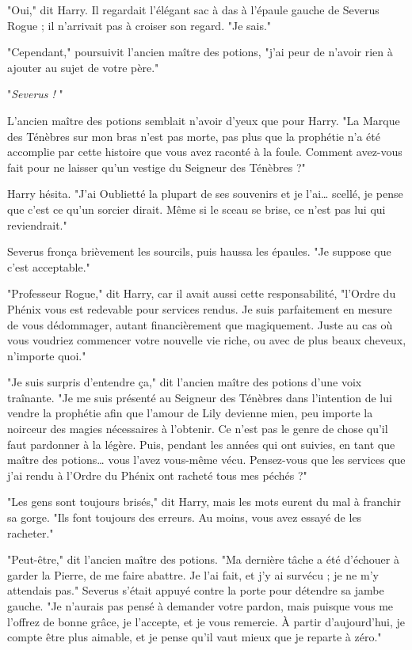 "Oui," dit Harry. Il regardait l'élégant sac à das à l'épaule gauche de Severus Rogue ; il n'arrivait pas à croiser son regard. "Je sais."

"Cependant," poursuivit l'ancien maître des potions, "j'ai peur de n'avoir rien à ajouter au sujet de votre père."

"\emph{Severus !} "

L'ancien maître des potions semblait n'avoir d'yeux que pour Harry. "La Marque des Ténèbres sur mon bras n'est pas morte, pas plus que la prophétie n'a été accomplie par cette histoire que vous avez raconté à la foule. Comment avez-vous fait pour ne laisser qu'un vestige du Seigneur des Ténèbres ?"

Harry hésita. "J'ai Oublietté la plupart de ses souvenirs et je l'ai… scellé, je pense que c'est ce qu'un sorcier dirait. Même si le sceau se brise, ce n'est pas lui qui reviendrait."

Severus fronça brièvement les sourcils, puis haussa les épaules. "Je suppose que c'est acceptable."

"Professeur Rogue," dit Harry, car il avait aussi cette responsabilité, "l'Ordre du Phénix vous est redevable pour services rendus. Je suis parfaitement en mesure de vous dédommager, autant financièrement que magiquement. Juste au cas où vous voudriez commencer votre nouvelle vie riche, ou avec de plus beaux cheveux, n'importe quoi."

"Je suis surpris d'entendre ça," dit l'ancien maître des potions d'une voix traînante. "Je me suis présenté au Seigneur des Ténèbres dans l'intention de lui vendre la prophétie afin que l'amour de Lily devienne mien, peu importe la noirceur des magies nécessaires à l'obtenir. Ce n'est pas le genre de chose qu'il faut pardonner à la légère. Puis, pendant les années qui ont suivies, en tant que maître des potions… vous l'avez vous-même vécu. Pensez-vous que les services que j'ai rendu à l'Ordre du Phénix ont racheté tous mes péchés ?"

"Les gens sont toujours brisés," dit Harry, mais les mots eurent du mal à franchir sa gorge. "Ils font toujours des erreurs. Au moins, vous avez essayé de les racheter."

"Peut-être," dit l'ancien maître des potions. "Ma dernière tâche a été d'échouer à garder la Pierre, de me faire abattre. Je l'ai fait, et j'y ai survécu ; je ne m'y attendais pas." Severus s'était appuyé contre la porte pour détendre sa jambe gauche. "Je n'aurais pas pensé à demander votre pardon, mais puisque vous me l'offrez de bonne grâce, je l'accepte, et je vous remercie. À partir d'aujourd'hui, je compte être plus aimable, et je pense qu'il vaut mieux que je reparte à zéro."

